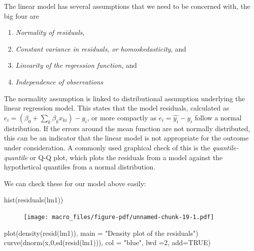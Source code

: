 \documentclass[
  letterpaper,
  DIV=11,
  numbers=noendperiod]{scrreprt}
\newenvironment{Shaded}{\begin{snugshade}}{\end{snugshade}}
\newcommand{\AttributeTok}[1]{\textcolor[rgb]{0.40,0.45,0.13}{#1}}
\newcommand{\ConstantTok}[1]{\textcolor[rgb]{0.56,0.35,0.01}{#1}}
\newcommand{\DecValTok}[1]{\textcolor[rgb]{0.68,0.00,0.00}{#1}}
\newcommand{\FunctionTok}[1]{\textcolor[rgb]{0.28,0.35,0.67}{#1}}
\newcommand{\NormalTok}[1]{\textcolor[rgb]{0.00,0.23,0.31}{#1}}
\newcommand{\StringTok}[1]{\textcolor[rgb]{0.13,0.47,0.30}{#1}}
\providecommand{\tightlist}{%
  \setlength{\itemsep}{0pt}\setlength{\parskip}{0pt}}\usepackage{longtable,booktabs,array}
\begin{document}
The linear model has several assumptions that we need to be concerned
with, the big four are

\begin{enumerate}
\def\labelenumi{\arabic{enumi})}
\tightlist
\item
  \emph{Normality of residuals},
\item
  \emph{Constant variance in residuals, or}
  \emph{\emph{homoskedasticity}}, and
\item
  \emph{Linearity of the regression function}, and
\item
  \emph{Independence of observations}
\end{enumerate}

The normality assumption is linked to distributional assumption
underlying the linear regression model. This states that the model
residuals, calculated as
\(e_i = (\beta_0 +\sum_k \beta_k x_{ki}) - y_i\), or more compactly as
\(e_i =\hat{y_i} - y_i\) follow a normal distribution. If the errors
around the mean function are not normally distributed, this can be an
indicator that the linear model is not appropriate for the outcome under
consideration. A commonly used graphical check of this is the
\emph{quantile-quantile} or Q-Q plot, which plots the residuals from a
model against the hypothetical quantiles from a normal distribution.

We can check these for our model above easily:

\begin{Shaded}
\begin{Highlighting}[]
\FunctionTok{hist}\NormalTok{(}\FunctionTok{residuals}\NormalTok{(lm1))}
\end{Highlighting}
\end{Shaded}

\begin{figure}[H]

{\centering \texttt{[image: macro\_files/figure-pdf/unnamed-chunk-19-1.pdf]}

}

\end{figure}

\begin{Shaded}
\begin{Highlighting}[]
\FunctionTok{plot}\NormalTok{(}\FunctionTok{density}\NormalTok{(}\FunctionTok{resid}\NormalTok{(lm1)),}
     \AttributeTok{main =} \StringTok{"Density plot of the residuals"}\NormalTok{)}
\FunctionTok{curve}\NormalTok{(}\FunctionTok{dnorm}\NormalTok{(x,}\DecValTok{0}\NormalTok{,}\FunctionTok{sd}\NormalTok{(}\FunctionTok{resid}\NormalTok{(lm1))),}
       \AttributeTok{col =} \StringTok{"blue"}\NormalTok{, }\AttributeTok{lwd =}\DecValTok{2}\NormalTok{, }\AttributeTok{add=}\ConstantTok{TRUE}\NormalTok{)}
\end{Highlighting}
\end{Shaded}
\end{document}
